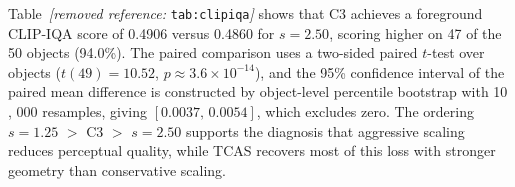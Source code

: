 \documentclass[times,twocolumn,final]{elsarticle}
\providecommand{\DIFdel}[1]{{\protect\color{red} \scriptsize #1}} %
\begin{document}

\DIFdel{Table~\textit{[removed reference: }\texttt{tab:clipiqa}\textit{]} shows that C3 achieves a foreground CLIP-IQA score of 0.4906 versus 0.4860 for $s = 2.50$, scoring higher on 47 of the 50 objects (94.0\%). The paired comparison uses a two-sided paired $t$-test over objects ($t(49)=10.52$, $p\approx3.6\times10^{-14}$), and the 95\% confidence interval of the paired mean difference is constructed by object-level percentile bootstrap with 10}%
\DIFdel{,}%
\DIFdel{000 resamples, giving $[0.0037,\,0.0054]$, which excludes zero. The ordering $s = 1.25$ $>$ C3 $>$ $s = 2.50$ supports the diagnosis that aggressive scaling reduces perceptual quality, while TCAS recovers most of this loss with stronger geometry than conservative scaling. }%
\end{document}
